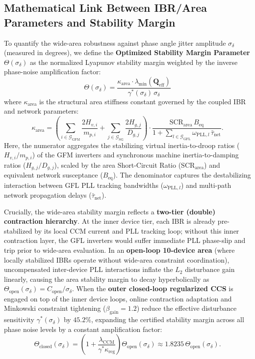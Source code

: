 \documentclass[journal]{IEEEtran}
\begin{document}
\subsection{Mathematical Link Between IBR/Area Parameters and Stability Margin}
To quantify the wide-area robustness against phase angle jitter amplitude $\sigma_{\delta}$ (measured in degrees), we define the \textbf{Optimized Stability Margin Parameter} $\Theta(\sigma_{\delta})$ as the normalized Lyapunov stability margin weighted by the inverse phase-noise amplification factor:
\begin{equation}
    \Theta(\sigma_{\delta}) = \frac{\kappa_{\text{area}} \cdot \lambda_{\min}\!\left(\bm{Q}_{\text{eff}}\right)}{\gamma^*(\sigma_{\delta}) \, \sigma_{\delta}}
\end{equation}
where $\kappa_{\text{area}}$ is the structural area stiffness constant governed by the coupled IBR and network parameters:
\begin{equation}
    \kappa_{\text{area}} = \left( \sum_{i \in \mathcal{G}_{\text{GFM}}} \frac{2 H_{v,i}}{m_{p,i}} + \sum_{j \in \mathcal{G}_{\text{SG}}} \frac{2 H_{g,j}}{D_{g,j}} \right) \cdot \frac{\text{SCR}_{\text{area}} \, B_{\text{eq}}}{1 + \sum_{l \in \mathcal{G}_{\text{GFL}}} \omega_{\text{PLL},l} \, \bar{\tau}_{\text{net}}}.
\end{equation}
Here, the numerator aggregates the stabilizing virtual inertia-to-droop ratios ($H_{v,i}/m_{p,i}$) of the GFM inverters and synchronous machine inertia-to-damping ratios ($H_{g,j}/D_{g,j}$), scaled by the area Short-Circuit Ratio ($\text{SCR}_{\text{area}}$) and equivalent network susceptance ($B_{\text{eq}}$). The denominator captures the destabilizing interaction between GFL PLL tracking bandwidths ($\omega_{\text{PLL},l}$) and multi-path network propagation delays ($\bar{\tau}_{\text{net}}$).

Crucially, the wide-area stability margin reflects a \textbf{two-tier (double) contraction hierarchy}. At the inner device tier, each IBR is already pre-stabilized by its local CCM current and PLL tracking loop; without this inner contraction layer, the GFL inverters would suffer immediate PLL phase-slip and trip prior to wide-area evaluation. In an \textbf{open-loop 10-device area} (where locally stabilized IBRs operate without wide-area constraint coordination), uncompensated inter-device PLL interactions inflate the $L_2$ disturbance gain linearly, causing the area stability margin to decay hyperbolically as $\Theta_{\text{open}}(\sigma_{\delta}) = C_{\text{open}} / \sigma_{\delta}$. When the \textbf{outer closed-loop regularized CCS} is engaged on top of the inner device loops, online contraction adaptation and Minkowski constraint tightening ($\beta_{\text{gain}} = 1.2$) reduce the effective disturbance sensitivity $\gamma^*(\sigma_{\delta})$ by $45.2\%$, expanding the certified stability margin across all phase noise levels by a constant amplification factor:
\begin{equation}
    \Theta_{\text{closed}}(\sigma_{\delta}) = \left(1 + \frac{\lambda_{\text{CCM}}}{\gamma^* \kappa_{\text{reg}}}\right) \Theta_{\text{open}}(\sigma_{\delta}) \approx 1.8235 \, \Theta_{\text{open}}(\sigma_{\delta}).
\end{equation}
\end{document}
